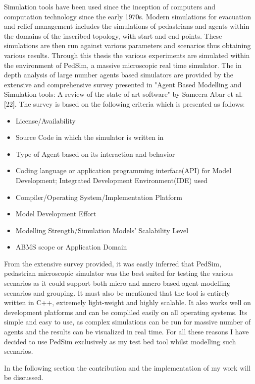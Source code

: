 Simulation tools have been used since the inception of computers and computation technology since the early 1970s. Modern simulations for evacuation and relief management includes the simulations of pedastrians and agents within the domains of the inscribed topology, with start and end points. These simulations are then run against various parameters and scenarios thus obtaining various results. Through this thesis the various experiments are simulated within the environment of PedSim, a massive microscopic real time simulator. The in depth analysis of large number agents based simulators are provided by the extensive and comprehensive survey presented in "Agent Based Modelling and Simulation tools: A review of the state-of-art software" by Sameera Abar et al. [22]. The survey is based on the following criteria which is presented as follows:

\begin{itemize}
  \item License/Availability
  \item Source Code in which the simulator is written in
  \item Type of Agent based on its interaction and behavior
  \item Coding language or application programming interface(API) for Model Development; Integrated Development Environment(IDE) used
  \item Compiler/Operating System/Implementation Platform
  \item Model Development Effort
  \item Modelling Strength/Simulation Models' Scalability Level
  \item ABMS scope or Application Domain
\end{itemize} 

From the extensive survey provided, it was easily inferred that PedSim, pedastrian microscopic simulator was the best suited for testing the various scenarios as it could support both micro and macro based agent modelling scenarios and grouping. It must also be mentioned that the tool is entirely written in C++, extremely light-weight and highly scalable. It also works well on development platforms and can be compliled easily on all operating systems. Its simple and easy to use, as complex simulations can be run for massive number of agents and the results can be visualized in real time. For all these reasons I have decided to use PedSim exclusively as my test bed tool whilst modelling such scenarios. 

In the following section the contribution and the implementation of my work will be discussed.


